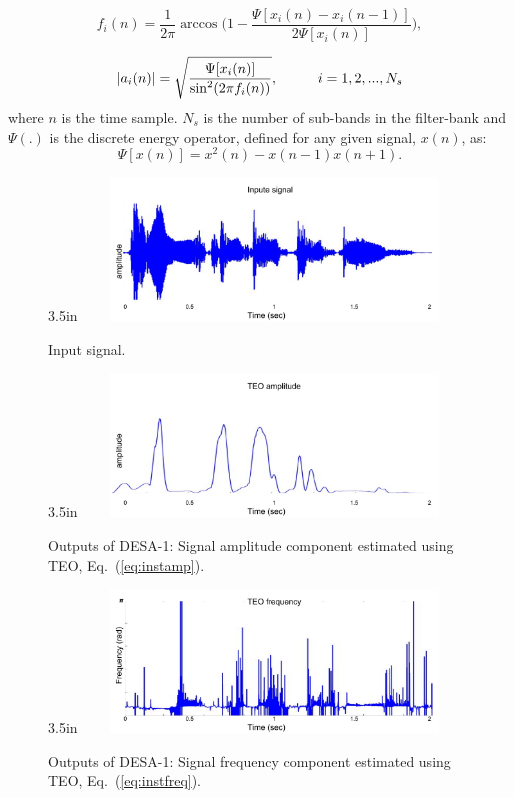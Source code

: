 {\begin{equation}
	\label{eq:instfreq}
	f_i(n) = \frac{1}{2\pi}\arccos \Big (1-\frac{\Psi[x_i(n)-x_i(n-1)]}{2\Psi[x_i(n)]}\Big),
\end{equation}
	
	
\begin{equation}
	\label{eq:instamp}
	|a_i(n)| = \sqrt{\frac{\Psi[x_i(n)]}{\sin^2(2\pi f_i(n))}} , \hspace{10mm}i=1,2,...,N_s
\end{equation}
where $n$ is the time sample. $N_s$ is the number of sub-bands in the filter-bank and $\Psi(.)$ is the discrete energy operator, defined for any given signal, $x(n)$, as:
\begin{equation}
	\Psi [x(n)] = x^2(n)-x(n-1)x(n+1).
\end{equation}


\begin{figure}[b]{3.5in}
	\centering
	\includegraphics[height=1.5in, width=4in]{figures/teo_signal}
	\caption{Input signal.}
\end{figure}
	
\vspace{1.0mm}
\begin{figure}[b]{3.5in}
	\centering
	\includegraphics[height=1.5in, width=4in]{figures/teo_amp}
	\caption{Outputs of DESA-1: Signal amplitude component estimated using TEO, Eq.~(\ref{eq:instamp}).}
\end{figure}

\begin{figure}[b]{3.5in}
	\centering
	\includegraphics[height=1.5in, width=4in]{figures/teo_freq}
	\caption{Outputs of DESA-1: Signal frequency component estimated using TEO,  Eq.~(\ref{eq:instfreq}).}
\end{figure}

}
